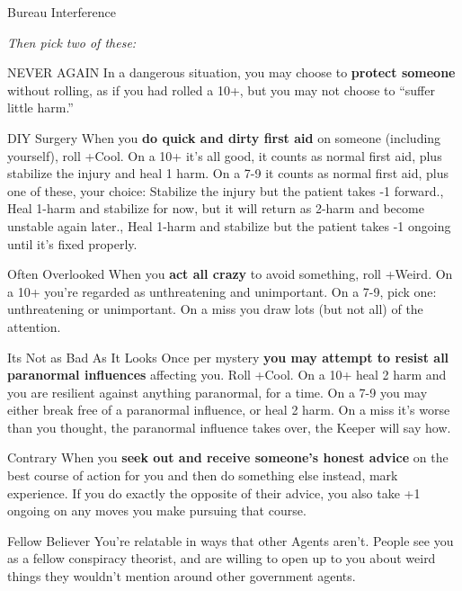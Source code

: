 {\begin{minipage}[t]{0.94\linewidth}
\begin{move}{Bureau Interference}
\end{move}
%
\end{minipage}
%
}{%
%
\textit{Then pick two of these:}
\brln
%
\begin{move}{NEVER AGAIN}
In a dangerous situation, you may choose to \textbf{protect someone} without rolling, as if you had rolled a 10+, but you may not choose to “suffer little harm.”
\end{move}%
\br[1mm]
%
\begin{move}{DIY Surgery}
When you \textbf{do quick and dirty first aid} on someone (including yourself), roll +Cool. On a 10+ it’s all good, it counts as normal first aid, plus stabilize the injury and heal 1 harm. On a 7-9 it counts as normal first aid, plus one of these, your choice:
\holdoptions%
    {{Stabilize the injury but the patient takes -1 forward.},
    {Heal 1-harm and stabilize for now, but it will return as 2-harm and become unstable again later.},
    {Heal 1-harm and stabilize but the patient takes -1 ongoing until it’s fixed properly.}}
\end{move}%
\br[1mm]
%
\begin{move}{Often Overlooked}
When you \textbf{act all crazy} to avoid something, roll +Weird.  On a 10+ you’re regarded as unthreatening and unimportant.  On a 7-9, pick one: unthreatening or unimportant.  On a miss you draw lots (but not all) of the attention.
\end{move}%
\br[1mm]
%
\begin{move}{Its Not as Bad As It Looks}
Once per mystery \textbf{you may attempt to resist all paranormal influences} affecting you.  Roll +Cool.  On a 10+ heal 2 harm and you are resilient against anything paranormal, for a time.  On a 7-9 you may either break free of a paranormal influence, or heal 2 harm.  On a miss it’s worse than you thought, the paranormal influence takes over, the Keeper will say how.
\end{move}%
\br[1mm]
%
\begin{move}{Contrary}
When you \textbf{seek out and receive someone’s honest advice} on the best course of action for you and then do something else instead, mark experience. If you do exactly the opposite of their advice, you also take +1 ongoing on any moves you make pursuing that course.
\end{move}
%
\begin{move}{Fellow Believer}
You’re relatable in ways that other Agents aren’t.  People see you as a fellow conspiracy theorist, and are willing to open up to you about weird things they wouldn’t mention around other government agents.
\end{move}
%
}\pagebreak%
